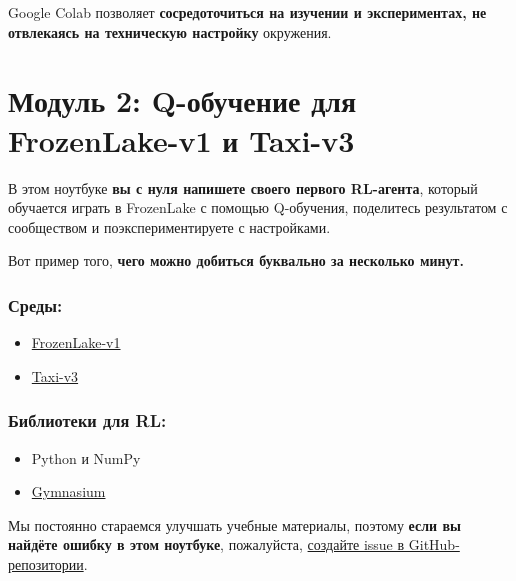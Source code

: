 \documentclass[11pt,a4paper]{article}
\begin{document}
Google Colab позволяет \textbf{сосредоточиться на изучении и экспериментах, не отвлекаясь на техническую настройку} окружения.

\section{Модуль 2: Q-обучение для FrozenLake-v1 и Taxi-v3}\label{unit-2-q-learning-with-frozenlake-v1-and-taxi-v3}


В этом ноутбуке \textbf{вы с нуля напишете своего первого RL-агента}, который обучается играть в FrozenLake с помощью Q-обучения, поделитесь результатом с сообществом и поэкспериментируете с настройками.

Вот пример того, \textbf{чего можно добиться буквально за несколько минут.}


\subsubsection{Среды:}\label{environments}

\begin{itemize}
\tightlist
\item
  \href{https://gymnasium.farama.org/environments/toy_text/frozen_lake/}{FrozenLake-v1}
\item
  \href{https://gymnasium.farama.org/environments/toy_text/taxi/}{Taxi-v3}
\end{itemize}

\subsubsection{Библиотеки для RL:}\label{rl-library}

\begin{itemize}
\tightlist
\item
  Python и NumPy
\item
  \href{https://gymnasium.farama.org/}{Gymnasium}
\end{itemize}

Мы постоянно стараемся улучшать учебные материалы, поэтому \textbf{если вы найдёте ошибку в этом ноутбуке}, пожалуйста, \href{https://github.com/huggingface/deep-rl-class/issues}{создайте issue в GitHub-репозитории}.
\end{document}
